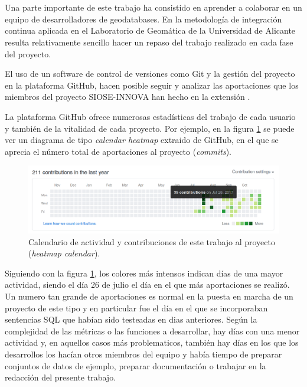 \section{\pgland{} \label{sec:pglandmetrics}}

Una parte importante de este trabajo ha consistido en aprender a colaborar en un equipo de desarrolladores de geodatabases. En la metodología de integración continua aplicada en el Laboratorio de Geomática de la Universidad de Alicante resulta relativamente sencillo hacer un repaso del trabajo realizado en cada fase del proyecto.

El uso de un software de control de versiones como Git y la gestión del proyecto en la plataforma GitHub, hacen posible seguir y analizar las aportaciones que los miembros del proyecto SIOSE-INNOVA han hecho en la extensión \pgland{}.

La plataforma GitHub ofrece numerosas estadísticas del trabajo de cada usuario y también de la vitalidad de cada proyecto. Por ejemplo, en la figura \ref{fig:contrib} se puede ver un diagrama de tipo \textit{calendar heatmap} extraido de GitHub, en el que se aprecia el número total de aportaciones al proyecto (\textit{commits}). 

\begin{figure}
\begin{center}
\includegraphics[width=\textwidth]{ResultadosyDiscusion/Figs/contributions.png}
\caption{Calendario de actividad y contribuciones de este trabajo al proyecto \pgland{} (\textit{heatmap calendar}). \label{fig:contrib}}
\end{center}
\end{figure}

Siguiendo con la figura \ref{fig:contrib}, los colores más intensos indican días de una mayor actividad, siendo el día 26 de julio el día en el que más aportaciones se realizó. Un numero tan grande de aportaciones es normal en la puesta en marcha de un proyecto de este tipo y en particular fue el día en el que se incorporaban sentencias SQL que habían sido testeadas en dias anteriores. Según la complejidad de las métricas o las funciones a desarrollar, hay días con una menor actividad y, en aquellos casos más problematicos, también hay días en los que los desarrollos los hacían otros miembros del equipo y había tiempo de preparar conjuntos de datos de ejemplo, preparar documentación o trabajar en la redacción del presente trabajo.

